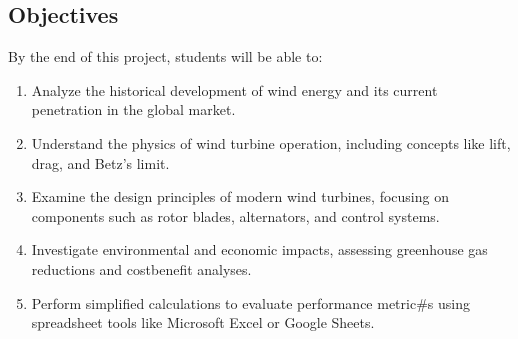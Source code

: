 \documentclass[letterpaper,10pt,english]{jupyterBook}
\begin{document}
\subsection{Objectives}
\label{\detokenize{ProjectInstructions:objectives}}
\sphinxAtStartPar
By the end of this project, students will be able to:
\begin{enumerate}
%
\item {} 
\sphinxAtStartPar
Analyze the historical development of wind energy and its current
penetration in the global market.

\item {} 
\sphinxAtStartPar
Understand the physics of wind turbine operation, including concepts
like lift, drag, and Betz’s limit.

\item {} 
\sphinxAtStartPar
Examine the design principles of modern wind turbines, focusing on
components such as rotor blades, alternators, and control systems.

\item {} 
\sphinxAtStartPar
Investigate environmental and economic impacts, assessing greenhouse
gas reductions and cost\sphinxhyphen{}benefit analyses.

\item {} 
\sphinxAtStartPar
Perform simplified calculations to evaluate performance metric\#s
using spreadsheet tools like Microsoft Excel or Google Sheets.

\end{enumerate}
\end{document}
